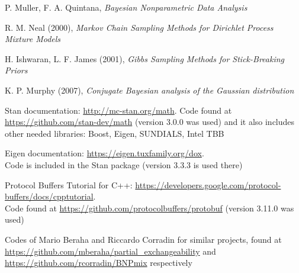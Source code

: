 \begin{thebibliography}{9}
 P. Muller, F. A. Quintana, \textit{Bayesian Nonparametric Data Analysis}

 R. M. Neal (2000), \textit{Markov Chain Sampling Methods for Dirichlet Process Mixture Models}

 H. Ishwaran, L. F. James (2001), \textit{Gibbs Sampling Methods for Stick-Breaking Priors}

 K. P. Murphy (2007), \textit{Conjugate Bayesian analysis of the Gaussian distribution}

 Stan documentation: \url{http://mc-stan.org/math}.
Code found at \url{https://github.com/stan-dev/math} (version 3.0.0 was used) and it also includes other needed libraries: Boost, Eigen, SUNDIALS, Intel TBB

 Eigen documentation: \url{https://eigen.tuxfamily.org/dox}. \\
Code is included in the Stan package (version 3.3.3 is used there)

 Protocol Buffers Tutorial for C++: \url{https://developers.google.com/protocol-buffers/docs/cpptutorial}. \\
Code found at \url{https://github.com/protocolbuffers/protobuf} (version 3.11.0 was used)

 Codes of Mario Beraha and Riccardo Corradin for similar projects, found at \url{https://github.com/mberaha/partial_exchangeability} and \url{https://github.com/rcorradin/BNPmix} respectively
\end{thebibliography}
